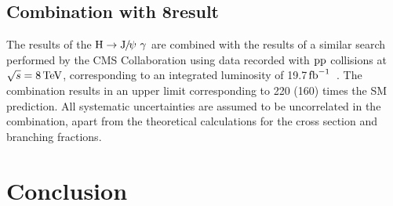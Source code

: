 \subsection*{Combination with 8\TeV result}
The results of the $\PH\rightarrow\JPsi\ \gamma$ are combined with the results of a similar search performed by the CMS Collaboration using data recorded with $\mathrm{p}\mathrm{p}$ collisions at $\sqrt{s}=8\,\text{Te\hspace{-.08em}V}$, corresponding to an integrated luminosity of 19.7$\mbox{\ensuremath{\,\text{fb}^\text{$-$1}}}$~\cite{Run1Paper_Dalitz}. The combination results in an upper limit corresponding to 220 (160) times the SM prediction. All systematic uncertainties are assumed to be uncorrelated in the combination, apart from the theoretical calculations for the cross section and branching fractions. 

\section{Conclusion}

